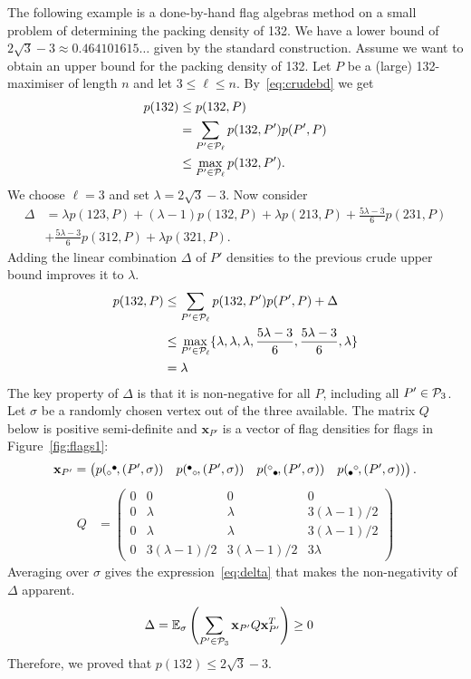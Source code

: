 \documentclass[12pt, a4paper, twoside]{report}
\begin{document}
The following example is a done-by-hand flag algebras method on a small problem of determining the packing density of 132. We have a lower bound of $2\sqrt{3}-3 \approx 0.464101615\ldots$ given by the standard construction. Assume we want to obtain an upper bound for the packing density of 132. Let $P$ be a (large) 132-maximiser of length $n$ and let $3 \leq \ell \leq n$. By~\eqref{eq:crudebd} we get
\begin{align*}
p(132) &\leq p(132, P)\\
  &= \sum_{P' \in \P_\ell}p(132,P')p(P',P)\\
       &\leq \max_{P' \in \P_\ell} p(132,P').
\end{align*}
We choose $\ell = 3$ and set $\lambda = 2\sqrt{3}-3$. Now consider 
\begin{align*}
\Delta &= \lambda p(123,P) + (\lambda-1)p(132,P) + \lambda p(213,P) + \frac{5\lambda-3}{6}p(231,P)\\
       &+ \frac{5\lambda-3}{6}p(312,P) + \lambda p(321,P).
\end{align*}
Adding the linear combination $\Delta$ of $P'$ densities to the previous crude upper bound improves it to $\lambda$.
\begin{align*}
p(132,P) &\leq \sum_{P' \in \P_\ell}p(132,P')p(P',P) + \Delta\\
&\leq \max_{P' \in \P_\ell}\{\lambda, \lambda,\lambda, \frac{5\lambda-3}{6}, \frac{5\lambda-3}{6},\lambda\}\\
&= \lambda
\end{align*}
The key property of $\Delta$ is that it is non-negative for all $P$, including all $P' \in \P_3$. Let $\sigma$ be a randomly chosen vertex out of the three available. The matrix $Q$ below is positive semi-definite and $\mathbf{x}_{P'}$ is a vector of flag densities for flags in Figure~\ref{fig:flags1}: $$\mathbf{x}_{P'} = \begin{pmatrix}p(\tauab,(P',\sigma))& p(\batau,(P',\sigma))& p(\tauba,(P',\sigma)) & p(\abtau,(P',\sigma))\end{pmatrix}.$$
\begin{align}
Q &= \begin{pmatrix}0 & 0 & 0 & 0 \\ 0 & \lambda & \lambda & 3(\lambda-1)/2\\0 & \lambda & \lambda & 3(\lambda-1)/2\\ 0 & 3(\lambda-1)/2 & 3(\lambda-1)/2 & 3\lambda  \end{pmatrix}
\label{eq:Q}
\end{align}
Averaging over $\sigma$ gives the expression~\eqref{eq:delta} that makes the non-negativity of $\Delta$ apparent.
\begin{align}
\Delta &= \mathbb{E}_\sigma\left(\sum_{P' \in \P_3}\mathbf{x}_{P'}Q\mathbf{x}_{P'}^T\right) \geq 0 \label{eq:delta}
\end{align}
Therefore, we proved that $p(132) \leq 2\sqrt{3}-3$. 
\end{document}
